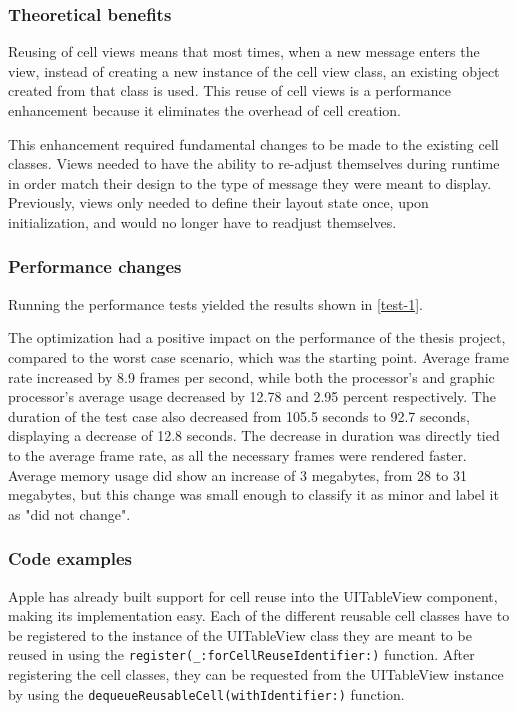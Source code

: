 \documentclass[a4paper,12pt]{article}
\begin{document}
\subsubsection{Theoretical benefits}
Reusing of cell views means that most times, when a new message enters the view, instead of creating a new instance of the cell view class, an existing object created from that class is used. This reuse of cell views is a performance enhancement because it eliminates the overhead of cell creation.\cite{AppleCharacteristicsOfCellObjects}

This enhancement required fundamental changes to be made to the existing cell classes. Views needed to have the ability to re-adjust themselves during runtime in order match their design to the type of message they were meant to display. Previously, views only needed to define their layout state once, upon initialization, and would no longer have to readjust themselves.

\subsubsection{Performance changes}
Running the performance tests yielded the results shown in \autoref{test-1}.

The optimization had a positive impact on the performance of the thesis project, compared to the worst case scenario, which was the starting point. Average frame rate increased by 8.9 frames per second, while both the processor's and graphic processor's average usage decreased by 12.78 and 2.95 percent respectively. The duration of the test case also decreased from 105.5 seconds to 92.7 seconds, displaying a decrease of 12.8 seconds. The decrease in duration was directly tied to the average frame rate, as all the necessary frames were rendered faster. Average memory usage did show an increase of 3 megabytes, from 28 to 31 megabytes, but this change was small enough to classify it as minor and label it as "did not change".

\subsubsection{Code examples}
Apple has already built support for cell reuse into the UITableView component, making its implementation easy. Each of the different reusable cell classes have to be registered to the instance of the UITableView class they are meant to be reused in using the \texttt{register(_:forCellReuseIdentifier:)} function.\cite{AppleRegisterMethod} After registering the cell classes, they can be requested from the UITableView instance by using the \texttt{dequeueReusableCell(withIdentifier:)} function.\cite{AppleDequeueReusableCellMethod}
\end{document}

